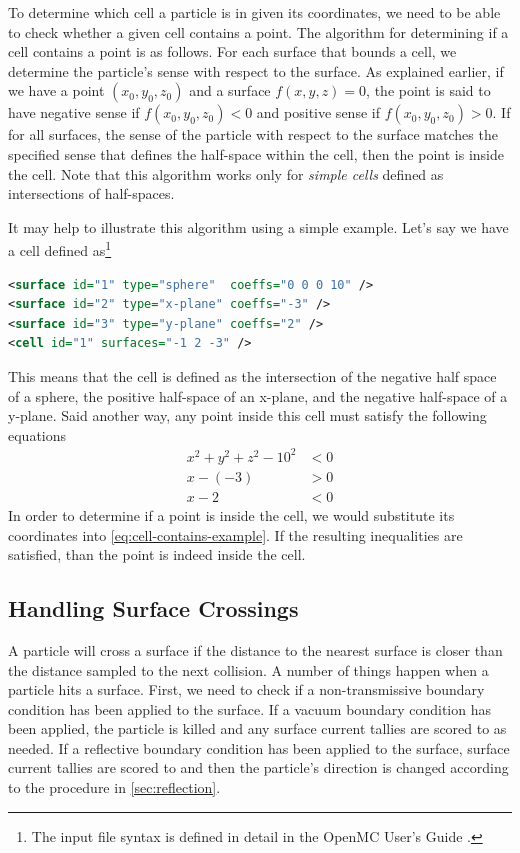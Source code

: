 To determine which cell a particle is in given its coordinates, we need to be
able to check whether a given cell contains a point. The algorithm for
determining if a cell contains a point is as follows. For each surface that
bounds a cell, we determine the particle's sense with respect to the surface. As
explained earlier, if we have a point $(x_0,y_0,z_0)$ and a surface $f(x,y,z) =
0$, the point is said to have negative sense if $f(x_0,y_0,z_0) < 0$ and
positive sense if $f(x_0,y_0,z_0) > 0$. If for all surfaces, the sense of the
particle with respect to the surface matches the specified sense that defines
the half-space within the cell, then the point is inside the cell. Note that
this algorithm works only for \emph{simple cells} defined as intersections of
half-spaces.

It may help to illustrate this algorithm using a simple example. Let's say we
have a cell defined as\footnote{The input file syntax is defined in detail in
  the OpenMC User's Guide \cite{romano-2012-doc}.}
\begin{lstlisting}[language=xml,frame=none]
<surface id="1" type="sphere"  coeffs="0 0 0 10" />
<surface id="2" type="x-plane" coeffs="-3" />
<surface id="3" type="y-plane" coeffs="2" />
<cell id="1" surfaces="-1 2 -3" />
\end{lstlisting}
This means that the cell is defined as the intersection of the negative half
space of a sphere, the positive half-space of an x-plane, and the negative
half-space of a y-plane. Said another way, any point inside this cell must
satisfy the following equations
\begin{equation}
  \label{eq:cell-contains-example}
  \begin{split}
    x^2 + y^2 + z^2 - 10^2 &< 0 \\
    x - (-3) &> 0 \\
    x - 2 &< 0
  \end{split}
\end{equation}
In order to determine if a point is inside the cell, we would substitute its
coordinates into \eqref{eq:cell-contains-example}. If the resulting inequalities
are satisfied, than the point is indeed inside the cell.

\subsection{Handling Surface Crossings}

A particle will cross a surface if the distance to the nearest surface is closer
than the distance sampled to the next collision. A number of things happen when
a particle hits a surface. First, we need to check if a non-transmissive
boundary condition has been applied to the surface. If a vacuum boundary
condition has been applied, the particle is killed and any surface current
tallies are scored to as needed. If a reflective boundary condition has been
applied to the surface, surface current tallies are scored to and then the
particle's direction is changed according to the procedure in
\autoref{sec:reflection}.

